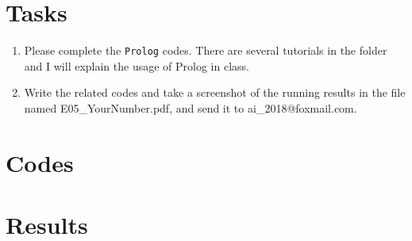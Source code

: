 ﻿\documentclass[a4paper, 11pt]{article}
\begin{document}
\section{Tasks}


\begin{enumerate}
\item Please complete the \texttt{Prolog} codes. There are several tutorials in the folder and I will explain the usage of Prolog in class.
\item Write the related codes and take a screenshot of the running results in the file named \textsf{E05\_YourNumber.pdf}, and send it to \textsf{ai\_2018@foxmail.com}.

\end{enumerate}
\section{Codes}
\section{Results}


%
%
\end{document}
